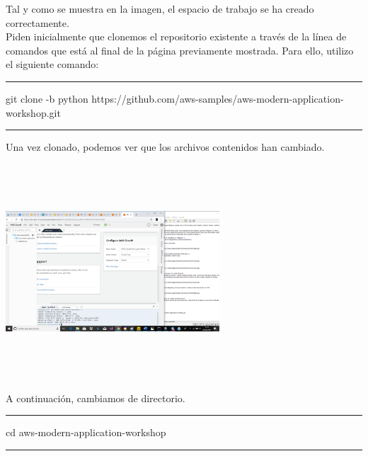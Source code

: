 \documentclass[english,runningheads,a4paper]{llncs}[2018/03/10]
\newenvironment{nscenter}
 {\parskip=0pt\par\nopagebreak\centering}
 {\par\noindent\ignorespacesafterend}
\begin{document}
\newline
Tal y como se muestra en la imagen, el espacio de trabajo se ha creado 
correctamente.\\ Piden inicialmente que clonemos el repositorio existente a 
través de la línea de comandos que está al final de la página previamente 
mostrada. Para ello, utilizo el siguiente comando:
\begin{nscenter}


\noindent\rule{10cm}{0.4pt}

git clone -b python https://github.com/aws-samples/aws-modern-application-workshop.git

\noindent\rule{10cm}{0.4pt}
\end{nscenter}

Una vez clonado, podemos ver que los archivos contenidos han cambiado.
\newline
\begin{nscenter}
\includegraphics[width=8cm,height=8cm,keepaspectratio]{./Contenedores/AWS/23.png}
\end{nscenter}
\newline
A continuación, cambiamos de directorio.
\begin{nscenter}


\noindent\rule{10cm}{0.4pt}

cd aws-modern-application-workshop

\noindent\rule{10cm}{0.4pt}
\end{nscenter}
\end{document}
